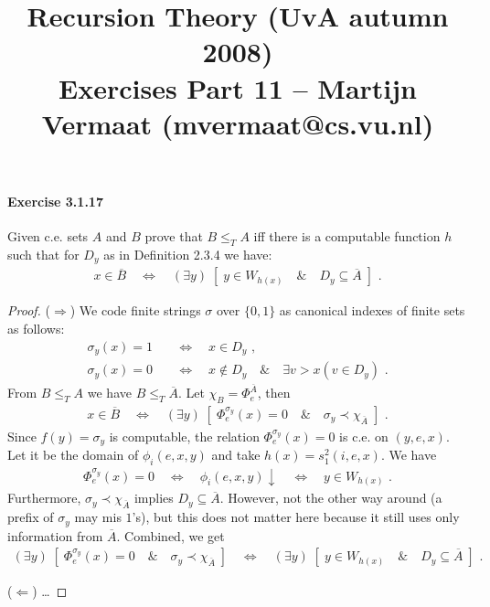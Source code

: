 \documentclass[a4paper,11pt]{article}
\title{Recursion Theory (UvA autumn 2008)\\
\normalsize{Exercises Part 11 -- Martijn Vermaat (mvermaat@cs.vu.nl)}}
\date{}
\begin{document}
\maketitle


\paragraph{Exercise 3.1.17}

Given c.e. sets $A$ and $B$ prove that $B \leq_T A$ iff there is a computable
function $h$ such that for $D_y$ as in Definition 2.3.4 we have:
\begin{align*}
  x \in \overline{B} \quad \Longleftrightarrow \quad (\exists y) \; [ \; y \in W_{h(x)} \quad \& \quad D_y \subseteq \overline{A} \; ] \text{ .}
\end{align*}

\begin{proof}
($\Rightarrow$)
We code finite strings $\sigma$ over $\{0, 1\}$ as canonical indexes of
finite sets as follows:
\begin{align*}
  \sigma_y(x) = 1 \quad & \Longleftrightarrow \quad x \in D_y \text{ ,} \\
  \sigma_y(x) = 0 \quad & \Longleftrightarrow \quad x \notin D_y \quad \& \quad \exists v \! > \! x (v \in D_y) \text{ .}
\end{align*}
From $B \leq_T A$ we have $B \leq_T \overline{A}$.
Let $\chi_B = \Phi^{\overline{A}}_e$, then
\begin{align*}
  x \in \overline{B} \quad \Longleftrightarrow \quad (\exists y) \; [ \; \Phi^{\sigma_y}_e(x) = 0 \quad \& \quad \sigma_y \prec \chi_{\overline{A}} \; ] \text{ .}
\end{align*}
Since $f(y) = \sigma_y$ is computable, the relation $\Phi^{\sigma_y}_e(x) = 0$ is c.e. on $(y, e, x)$.
Let it be the domain of $\phi_i(e, x, y)$ and take $h(x) = s^2_1(i, e, x)$. We have
\begin{align*}
  \Phi^{\sigma_y}_e(x) = 0 \quad \Longleftrightarrow \quad \phi_i(e, x, y) \! \downarrow \quad \Longleftrightarrow \quad y \in W_{h(x)} \text{ .}
\end{align*}
Furthermore, $\sigma_y \prec \chi_{\overline{A}}$ implies $D_y \subseteq \overline{A}$.
However, not the other way around (a prefix of $\sigma_y$ may mis $1$'s), but this does not
matter here because it still uses only information from $\overline{A}$. Combined, we get
\begin{align*}
  (\exists y) \; [ \; \Phi^{\sigma_y}_e(x) = 0 \quad \& \quad \sigma_y \prec \chi_{\overline{A}} \; ] \quad \Longleftrightarrow \quad (\exists y) \; [ \; y \in W_{h(x)} \quad \& \quad D_y \subseteq \overline{A} \; ] \text{ .}
\end{align*}

($\Leftarrow$)
\ldots
\end{proof}
\end{document}
